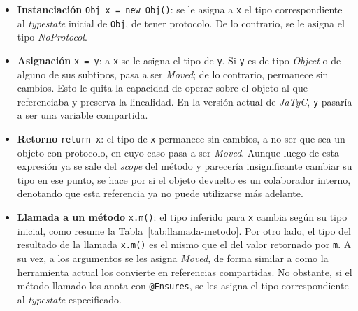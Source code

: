 \begin{itemize}
    \item \textbf{Instanciación} \texttt{Obj x = new Obj()}: se le asigna a \texttt{x} el tipo correspondiente al \textit{typestate} inicial de \texttt{Obj}, de tener protocolo. De lo contrario, se le asigna el tipo \textit{NoProtocol}.
    \item \textbf{Asignación} \texttt{x = y}: a \texttt{x} se le asigna el tipo de \texttt{y}. Si \texttt{y} es de tipo \textit{Object} o de alguno de sus subtipos, pasa a ser \textit{Moved}; de lo contrario, permanece sin cambios. Esto le quita la capacidad de operar sobre el objeto al que referenciaba y preserva la linealidad. En la versión actual de \textit{JaTyC}, \texttt{y} pasaría a ser una variable compartida.
    \item \textbf{Retorno} \texttt{return x}: el tipo de \texttt{x} permanece sin cambios, a no ser que sea un objeto con protocolo, en cuyo caso pasa a ser \textit{Moved}. Aunque luego de esta expresión ya se sale del \textit{scope} del método y parecería insignificante cambiar su tipo en ese punto, se hace por si el objeto devuelto es un colaborador interno, denotando que esta referencia ya no puede utilizarse más adelante.
    \item \textbf{Llamada a un método} \texttt{x.m()}: el tipo inferido para \texttt{x} cambia según su tipo inicial, como resume la Tabla~\ref{tab:llamada-metodo}. Por otro lado, el tipo del resultado de la llamada \texttt{x.m()} es el mismo que el del valor retornado por \texttt{m}. A su vez, a los argumentos se les asigna \textit{Moved}, de forma similar a como la herramienta actual los convierte en referencias compartidas. No obstante, si el método llamado los anota con \texttt{@Ensures}, se les asigna el tipo correspondiente al \textit{typestate} especificado.
\end{itemize}

